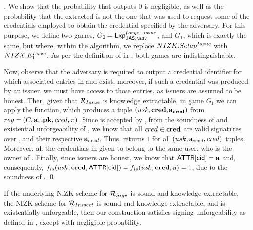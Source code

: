 \begin{proof}[]
  We show that the probability that \fissue outputs $0$ is negligible, as well
  as the probability that the extracted \usk is not the one that was used to
  request some of the credentials employed to obtain the credential specified by
  the adversary.
  For this purpose, we define two games, $G_0=\ExpForgeIssue$, and $G_1$, which
  is exactly the same, but where, within the \Setup algorithm, we replace
  $NIZK.Setup^{Issue}$ with $NIZK.E_1^{Issue}$. As per the definition of
  \NIZK in , both games are indistinguishable.

  Now, observe that the adversary is required to output a credential
  identifier for which associated entries in \trans and \CRED exist; moreover,
  if such a credential was produced by an issuer, we must have access to those
  entries, as issuers are assumed to be honest.
  Then, given that $\mathcal{R}_{Issue}$ is knowledge extractable, in game $G_1$
  we can apply the \NIZKExtII function, which produces a tuple $(usk,\mathbf{cred},
  \mathbf{a}_{\mathbf{cred}})$ from $reg = (C,\mathbf{a},\mathbf{ipk},cred,\pi)$.
  Since \NIZKproof is accepted by \ExtractIssue, from the soundness of \NIZK and
  existential unforgeability of \SBCM, we know that all $cred \in \mathbf{cred}$ are
  valid signatures over \usk, and their respective $\mathbf{a}_{cred}$. Thus,
  \Identify returns $1$ for all $(usk,\mathbf{a}_{cred},cred)$ tuples.
  Moreover, all the credentials in \scred given to \fissue belong to the same
  user, who is the owner of \usk.
  Finally, since issuers are honest, we know that $\mathsf{ATTR}[\mathsf{cid}] = \mathbf{a}$ and,
  consequently, $f_{is}(usk,\mathbf{cred},\mathsf{ATTR}[\mathsf{cid}]) = f_{is}(usk,\mathbf{cred},\mathbf{a})
  = 1$, due to the soundness of \NIZK.
  \qed
\end{proof}

\begin{theorem}
  \label{thm:sign-forge-uas}
  If the underlying NIZK scheme for $\mathcal{R}_{Sign}$ is sound and knowledge
  extractable, the NIZK scheme for $\mathcal{R}_{Inspect}$ is sound and knowledge
  extractable, and \SBCM is existentially unforgeable, then our \CUASGen
  construction satisfies signing unforgeability as defined in
  , except with negligible probability.
\end{theorem}

